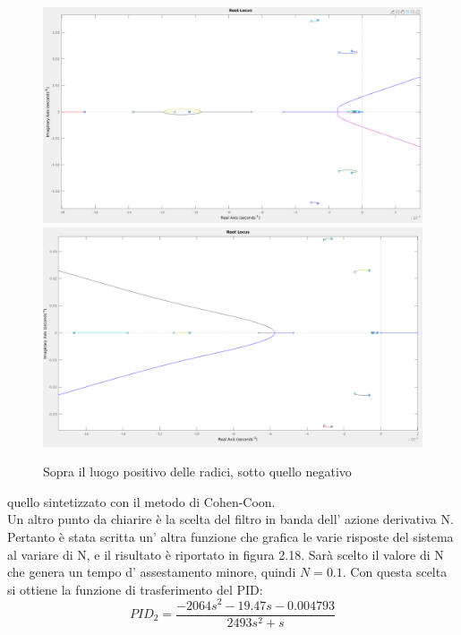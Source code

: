 \documentclass[Lau,noexaminfo]{sapthesis}
\begin{document}
	\begin{figure}[h]
		\centering
		\includegraphics[height=0.35\textheight]{rlocus_P2_pos}\\
		\includegraphics[height=0.355\textheight]{rlocus_P2_neg}\\
		\caption{Sopra il luogo positivo delle radici, sotto quello negativo}
	\end{figure} 
	quello sintetizzato con il metodo di Cohen-Coon.\\
	Un altro punto da chiarire è la scelta del filtro in banda dell' azione derivativa N. Pertanto è stata scritta un' altra funzione che grafica le varie risposte del sistema al variare di N, e il risultato è riportato in figura 2.18. Sarà scelto il valore di N che genera un tempo d' assestamento minore, quindi $N=0.1$. Con questa scelta si ottiene la funzione di trasferimento del PID:
	\begin{equation*}
	PID_2=\frac{-2064s^2-19.47s-0.004793}{2493s^2+s}
	\end{equation*}
\end{document}
